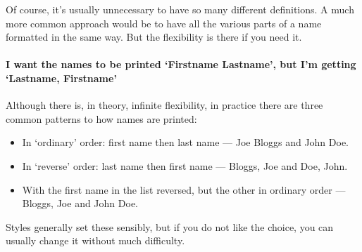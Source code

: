Of course, it's usually unnecessary to have so many different definitions. A much more common approach would be to have all the various parts of a name formatted in the same way. But the flexibility is there if you need it.

\paragraph{I want the names to be printed `Firstname Lastname', but I'm getting `Lastname, Firstname'} Although there is, in theory, infinite flexibility, in practice there are three common patterns to how names are printed:
\begin{itemize}
  \item In `ordinary' order: first name then last name --- Joe Bloggs and John Doe.
  \item In `reverse' order: last name then first name --- Bloggs, Joe and Doe, John.
  \item With the first name in the list reversed, but the other in ordinary order --- Bloggs, Joe and John Doe.
\end{itemize}
Styles generally set these sensibly, but if you do not like the choice, you can usually change it without much difficulty.
